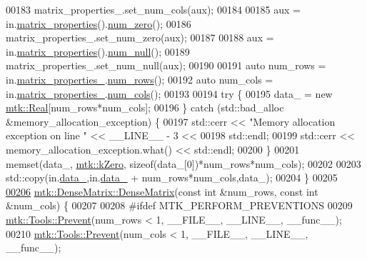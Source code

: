 \begin{DoxyCode}
00183   matrix\_properties\_.set\_num\_cols(aux);
00184 
00185   aux = in.\hyperlink{classmtk_1_1DenseMatrix_a5aa83a0643f27a4652ea97630edf7143}{matrix\_properties}().\hyperlink{classmtk_1_1Matrix_a17f99bfdf7b8071962c37550028c22b5}{num\_zero}();
00186   matrix\_properties\_.set\_num\_zero(aux);
00187 
00188   aux = in.\hyperlink{classmtk_1_1DenseMatrix_a5aa83a0643f27a4652ea97630edf7143}{matrix\_properties}().\hyperlink{classmtk_1_1Matrix_a79ac4c1b31cef05b41a123917b0ad32f}{num\_null}();
00189   matrix\_properties\_.set\_num\_null(aux);
00190 
00191   \textcolor{keyword}{auto} num\_rows = in.\hyperlink{classmtk_1_1DenseMatrix_a481c8d09af685a5ba67acefdcaa810cc}{matrix\_properties\_}.\hyperlink{classmtk_1_1Matrix_ab308b25b48e4fcd39fc60e0c3fc66dea}{num\_rows}();
00192   \textcolor{keyword}{auto} num\_cols = in.\hyperlink{classmtk_1_1DenseMatrix_a481c8d09af685a5ba67acefdcaa810cc}{matrix\_properties\_}.\hyperlink{classmtk_1_1Matrix_a2160118d0edf51cf2aaa806ee1b915f8}{num\_cols}();
00193 
00194   \textcolor{keywordflow}{try} \{
00195     data\_ = \textcolor{keyword}{new} \hyperlink{group__c01-roots_gac080bbbf5cbb5502c9f00405f894857d}{mtk::Real}[num\_rows*num\_cols];
00196   \} \textcolor{keywordflow}{catch} (std::bad\_alloc &memory\_allocation\_exception) \{
00197     std::cerr << \textcolor{stringliteral}{"Memory allocation exception on line "} << \_\_LINE\_\_ - 3 <<
00198       std::endl;
00199     std::cerr << memory\_allocation\_exception.what() << std::endl;
00200   \}
00201   memset(data\_, \hyperlink{group__c01-roots_ga59a451a5fae30d59649bcda274fea271}{mtk::kZero}, \textcolor{keyword}{sizeof}(data\_[0])*num\_rows*num\_cols);
00202 
00203   std::copy(in.\hyperlink{classmtk_1_1DenseMatrix_a7893e4e5c8d2e2de32b156177e78cb6f}{data\_},in.\hyperlink{classmtk_1_1DenseMatrix_a7893e4e5c8d2e2de32b156177e78cb6f}{data\_} + num\_rows*num\_cols,data\_);
00204 \}
00205 
\hypertarget{mtk__dense__matrix_8cc_source_l00206}{}\hyperlink{classmtk_1_1DenseMatrix_abe26c623467fc1b293cf4f22a3a47cc8}{00206} \hyperlink{classmtk_1_1DenseMatrix_a0c75ee704707983f935b02835eab0933}{mtk::DenseMatrix::DenseMatrix}(\textcolor{keyword}{const} \textcolor{keywordtype}{int} &num\_rows, \textcolor{keyword}{const} \textcolor{keywordtype}{int} &num\_cols) \{
00207 
00208 \textcolor{preprocessor}{  #ifdef MTK\_PERFORM\_PREVENTIONS}
00209   \hyperlink{classmtk_1_1Tools_a332324c6f25e66be9dff48c5987a3b9f}{mtk::Tools::Prevent}(num\_rows < 1, \_\_FILE\_\_, \_\_LINE\_\_, \_\_func\_\_);
00210   \hyperlink{classmtk_1_1Tools_a332324c6f25e66be9dff48c5987a3b9f}{mtk::Tools::Prevent}(num\_cols < 1, \_\_FILE\_\_, \_\_LINE\_\_, \_\_func\_\_);

\end{DoxyCode}
